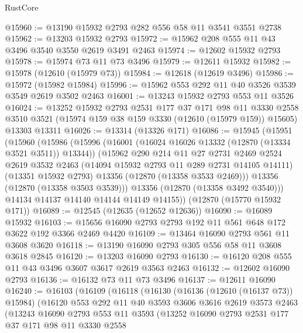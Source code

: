 \begin{lexlean}{RustCore}
\begin{coremodule}
@15960 := @13190 @15932 @2793 @282 @556 @58 @11 @3541 @3551 @2738
@15962 := @13203 @15932 @2793
@15972 := @15962 @208 @555 @11 @43 @3496 @3540 @3550 @2619 @3491 @2463
@15974 := @12602 @15932 @2793
@15978 := @15974 @73 @11 @73 @3496
@15979 := @12611 @15932
@15982 := @15978 (@12610 (@15979 @73))
@15984 := @12618 (@12619 @3496)
@15986 := @15972 (@15982 @15984)
@15996 := @15962 @553 @292 @11 @40 @3526 @3539 @3549 @2619 @3502 @2463
@16001 := @13243 @15932 @2793 @553 @11 @3526
@16024 := @13252
    @15932
    @2793
    @2531
    @177
    @37
    @171
    @98
    @11
    @3330
    @2558
    @3510
    @3521
    (@15974 @159 @38 @159 @3330 (@12610 (@15979 @159)) @15605)
    @13303
    @13311
@16026 := @13314 (@13326 @171)
@16086 := @15945
    (@15951
      (@15960
        (@15986
          (@15996
            (@16001 (@16024 @16026 @13332 (@12870 (@13334 @3521 @3511)) @13344))
            (@15962
              @290
              @214
              @11
              @27
              @2731
              @2469
              @2524
              @2619
              @3532
              @2463
              (@14094 @15932 @2793 @11 @289 @2731 @14105 @14111)
              (@13351 @15932 @2793)
              @13356
              (@12870 (@13358 @3533 @2469)))
            @13356
            (@12870 (@13358 @3503 @3539)))
          @13356
          (@12870 (@13358 @3492 @3540)))
        @14134
        @14137
        @14140
        @14144
        @14149
        @14155))
    (@12870 (@15770 @15932 @171))
@16089 := @12545 (@12635 (@12652 @12636))
@16090 := @16089 @15932
@16103 := @15656 @16090 @2793 @2793 @192 @11 @561 @648 @172 @3622 @192 @3366 @2469 @4420
@16109 := @13464 @16090 @2793 @561 @11 @3608 @3620
@16118 := @13190 @16090 @2793 @305 @556 @58 @11 @3608 @3618 @2845
@16120 := @13203 @16090 @2793
@16130 := @16120 @208 @555 @11 @43 @3496 @3607 @3617 @2619 @3563 @2463
@16132 := @12602 @16090 @2793
@16136 := @16132 @73 @11 @73 @3496
@16137 := @12611 @16090
@16240 := @16103
    (@16109
      (@16118
        (@16130
          (@16136 (@12610 (@16137 @73)) @15984)
          (@16120
            @553
            @292
            @11
            @40
            @3593
            @3606
            @3616
            @2619
            @3573
            @2463
            (@13243
              @16090
              @2793
              @553
              @11
              @3593
              (@13252
                @16090
                @2793
                @2531
                @177
                @37
                @171
                @98
                @11
                @3330
                @2558

\end{coremodule}
\end{lexlean}
